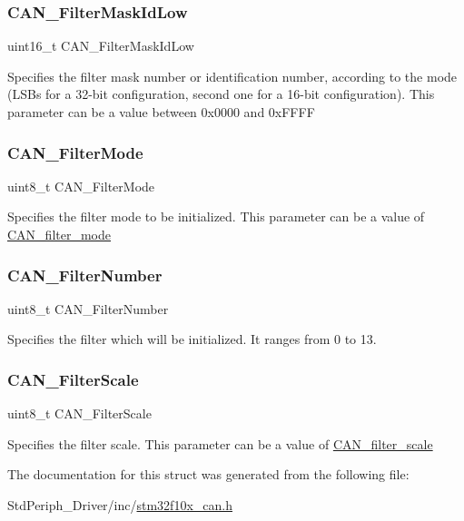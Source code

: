 \subsubsection{\texorpdfstring{CAN\_FilterMaskIdLow}{CAN\_FilterMaskIdLow}}
{\footnotesize\ttfamily uint16\+\_\+t C\+A\+N\+\_\+\+Filter\+Mask\+Id\+Low}

Specifies the filter mask number or identification number, according to the mode (L\+S\+Bs for a 32-\/bit configuration, second one for a 16-\/bit configuration). This parameter can be a value between 0x0000 and 0x\+F\+F\+FF \mbox{\label{struct_c_a_n___filter_init_type_def_a0fecca0da838d863a15294277db8f8fe}} 
\subsubsection{\texorpdfstring{CAN\_FilterMode}{CAN\_FilterMode}}
{\footnotesize\ttfamily uint8\+\_\+t C\+A\+N\+\_\+\+Filter\+Mode}

Specifies the filter mode to be initialized. This parameter can be a value of \mbox{\hyperlink{group___c_a_n__filter__mode}{C\+A\+N\+\_\+filter\+\_\+mode}} \mbox{\label{struct_c_a_n___filter_init_type_def_a4657eff323f0e2d379115fd06f5c8d74}} 
\subsubsection{\texorpdfstring{CAN\_FilterNumber}{CAN\_FilterNumber}}
{\footnotesize\ttfamily uint8\+\_\+t C\+A\+N\+\_\+\+Filter\+Number}

Specifies the filter which will be initialized. It ranges from 0 to 13. \mbox{\label{struct_c_a_n___filter_init_type_def_a434a665b1a2781348818d285dd18b6d5}} 
\subsubsection{\texorpdfstring{CAN\_FilterScale}{CAN\_FilterScale}}
{\footnotesize\ttfamily uint8\+\_\+t C\+A\+N\+\_\+\+Filter\+Scale}

Specifies the filter scale. This parameter can be a value of \mbox{\hyperlink{group___c_a_n__filter__scale}{C\+A\+N\+\_\+filter\+\_\+scale}} 

The documentation for this struct was generated from the following file\+:\begin{DoxyCompactItemize}
\item 
Std\+Periph\+\_\+\+Driver/inc/\mbox{\hyperlink{stm32f10x__can_8h}{stm32f10x\+\_\+can.\+h}}\end{DoxyCompactItemize}

